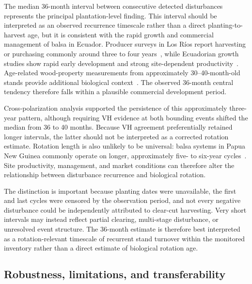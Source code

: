 The median 36-month interval between consecutive detected disturbances represents the principal plantation-level finding. This interval should be interpreted as an observed recurrence timescale rather than a direct planting-to-harvest age, but it is consistent with the rapid growth and commercial management of balsa in Ecuador. Producer surveys in Los R\'ios report harvesting or purchasing commonly around three to four years~\citep{GonzalezOsorio2010Balsa}, while Ecuadorian growth studies show rapid early development and strong site-dependent productivity~\citep{CanadasLopez2019BalsaGrowth}. Age-related wood-property measurements from approximately 30--40-month-old stands provide additional biological context~\citep{Moya2025BalsaProperties}. The observed 36-month central tendency therefore falls within a plausible commercial development period.

Cross-polarization analysis supported the persistence of this approximately three-year pattern, although requiring VH evidence at both bounding events shifted the median from 36 to 40 months. Because VH agreement preferentially retained longer intervals, the latter should not be interpreted as a corrected rotation estimate. Rotation length is also unlikely to be universal: balsa systems in Papua New Guinea commonly operate on longer, approximately five- to six-year cycles~\citep{Jenkin2019BalsaValueChain,Midgley2010Balsa}. Site productivity, management, and market conditions can therefore alter the relationship between disturbance recurrence and biological rotation.

The distinction is important because planting dates were unavailable, the first and last cycles were censored by the observation period, and not every negative disturbance could be independently attributed to clear-cut harvesting. Very short intervals may instead reflect partial clearing, multi-stage disturbance, or unresolved event structure. The 36-month estimate is therefore best interpreted as a rotation-relevant timescale of recurrent stand turnover within the monitored inventory rather than a direct estimate of biological rotation age.





\subsection{Robustness, limitations, and transferability}

